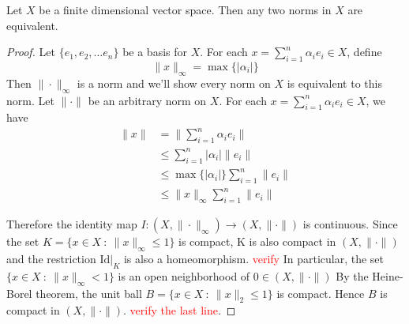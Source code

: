 \begin{corollary}
  Let $X$ be a finite dimensional vector space. Then any two norms in
  $X$ are equivalent.
\end{corollary}
\begin{proof}
  Let $\{ e_1, e_2, \ldots e_n \}$ be a basis for $X$. For each $x =
  \sum_{i = 1}^{n} \alpha_i e_i \in X$, define \[
    \|x\|_\infty = \max \{ |\alpha_i| \}
  \]
  Then $\|\cdot\|_\infty$ is a norm and we'll show every norm on $X$
  is equivalent to this norm. Let $\|\cdot\|$ be an arbitrary norm on
  $X$. For each $x = \sum_{i = 1}^{n} \alpha_i e_i \in X$, we have
  \begin{align*}
    \|x\| &= \|\sum_{i = 1}^{n} \alpha_i e_i\| \\
    & \le \sum_{i = 1}^{n} |\alpha_i|\|e_i\| \\
    &\le \max \{ |\alpha_i| \} \sum_{i = 1}^{n} \|e_i\| \\
    & \le \|x\|_\infty \sum_{i = 1}^{n} \|e_i\|
  \end{align*}

  Therefore the identity map $I: (X, \|\cdot\|_\infty) \to (X,
  \|\cdot\|)$ is continuous. Since the set $ K = \{ x \in X \ :
  \ \|x\|_\infty \le 1 \}$ is compact,  K is also compact in $(X,
  \|\cdot\|)$ and the restriction $\textrm{Id}|_K$ is also a
  homeomorphism. \textcolor{red}{verify}
  In particular, the set $\{ x \in X  \ : \  \|x\|_\infty < 1 \}$ is
  an open neighborhood of $0 \in (X, \|\cdot\|)$
  By the Heine-Borel theorem, the unit ball $B = \{ x \in X  \ : \
  \|x\|_2 \le 1 \}$ is compact. Hence $B$ is compact in $(X,
  \|\cdot\|)$. \textcolor{red}{verify the last line}.
\end{proof}

